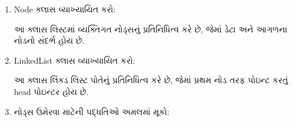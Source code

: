 \begin{enumerate}
\def\labelenumi{\arabic{enumi}.}
\item
  Node ક્લાસ વ્યાખ્યાયિત કરો:

\begin{Shaded}
\begin{Highlighting}[]
     \NormalTok{(}
        \OperatorTok{=}
         \OperatorTok{=} 
\end{Highlighting}
\end{Shaded}

  આ ક્લાસ લિસ્ટમાં વ્યક્તિગત નોડ્સનું પ્રતિનિધિત્વ કરે છે, જેમાં ડેટા અને આગળના નોડનો
  સંદર્ભ હોય છે.
\item
  LinkedList ક્લાસ વ્યાખ્યાયિત કરો:

\begin{Shaded}
\begin{Highlighting}[]
     \NormalTok{(}\NormalTok{):}
        \OperatorTok{=} 
\end{Highlighting}
\end{Shaded}

  આ ક્લાસ લિંક્ડ લિસ્ટ પોતેનું પ્રતિનિધિત્વ કરે છે, જેમાં પ્રથમ નોડ તરફ પોઇન્ટ કરતું head
  પોઇન્ટર હોય છે.
\item
  નોડ્સ ઉમેરવા માટેની પદ્ધતિઓ અમલમાં મૂકો:

\begin{Shaded}
\begin{Highlighting}[]
\OperatorTok{=}
      
        \OperatorTok{=}
\OperatorTok{=} 
    \NormalTok{:}
\OperatorTok{=}
 \OperatorTok{=}
\end{Highlighting}
\end{Shaded}


\end{enumerate}
